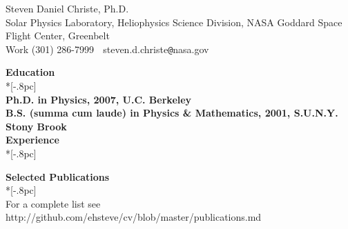 \documentclass[11pt]{article}
\begin{document}
\begin{center}
{\Large Steven Daniel Christe, Ph.D.} \\[.5pc]
Solar Physics Laboratory, Heliophysics Science Division, NASA Goddard Space Flight Center, Greenbelt \\
Work (301) 286-7999 $\;$ steven.d.christe\verb|@|nasa.gov $\;$ \\[2pc]
\end{center}
\vspace{-0.2in}
{\large \bf Education} \\*[-.8pc]
\underline{\hspace{6in}} \\
{\bf Ph.D. in Physics, 2007, U.C. Berkeley} \\
{\bf B.S. (summa cum laude) in Physics \& Mathematics, 2001, S.U.N.Y. Stony Brook} \\

{\large \bf Experience} \\*[-.8pc]
\underline{\hspace{6in}}



{\large \bf Selected Publications} \\*[-.8pc]
\underline{\hspace{6in}} \\
For a complete list see http://github.com/ehsteve/cv/blob/master/publications.md


\end{document}
